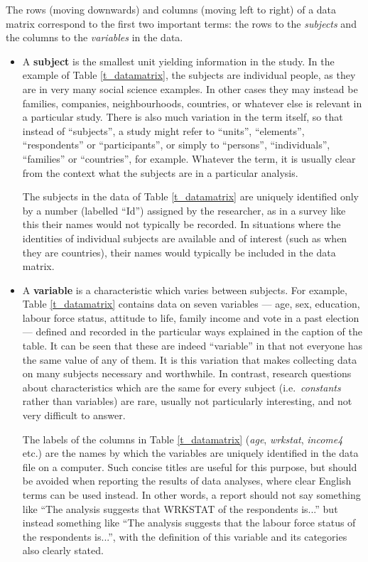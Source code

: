 The rows (moving downwards) and columns (moving left to right) of a data
matrix correspond to the first two important terms: the rows
to the \emph{subjects} and the columns to the \emph{variables} in the
data.
\begin{itemize}
\item
A \textbf{subject} is the smallest unit yielding information in the
study. In the example of Table \ref{t_datamatrix}, the subjects are
individual people, as they are in very many
social science examples. In other cases they may instead be families,
companies, neighbourhoods, countries, or whatever else is relevant in a
particular study. There is also much variation in the term itself, so
that instead of ``subjects'', a study might refer to ``units'',
``elements'', ``respondents'' or ``participants'', or simply to
``persons'', ``individuals'', ``families'' or ``countries'', for
example. Whatever the term, it is usually clear from the context what
the subjects are in a particular analysis.

The subjects in the data of Table \ref{t_datamatrix} are uniquely
identified only by a number (labelled ``Id'') assigned by the
researcher, as in a survey like this their names would not
typically be recorded. In situations where the identities of individual
subjects are available and of interest (such as when they are countries),
their names would typically be included in the data matrix.
\item
A \textbf{variable} is a characteristic which varies between subjects. For
example, Table \ref{t_datamatrix} contains data on seven variables ---
age, sex, education, labour force status, attitude to life,
family income and vote in a past election --- defined and recorded in the
particular ways explained in the caption of the table. It can be seen
that these are indeed ``variable'' in that not everyone has the same
value of any of them. It is this variation that makes collecting data on
many subjects necessary and worthwhile. In contrast, research questions
about characteristics which are the same for every subject (i.e.\
\emph{constants} rather than variables) are rare, usually not
particularly interesting, and not very difficult to answer.

The labels of the columns in Table \ref{t_datamatrix} (\emph{age},
\emph{wrkstat}, \emph{income4} etc.) are the names by which the
variables are uniquely identified in the data file on a computer. Such
concise titles are useful for this
purpose, but should be avoided when reporting the results of data
analyses, where clear English terms can be used instead. In other words,
a report should not say something like ``The analysis suggests that
WRKSTAT of the respondents is...'' but instead something like ``The
analysis suggests that the labour force status of the respondents
is...'', with the definition of this variable and its categories
also clearly stated.
\end{itemize}
